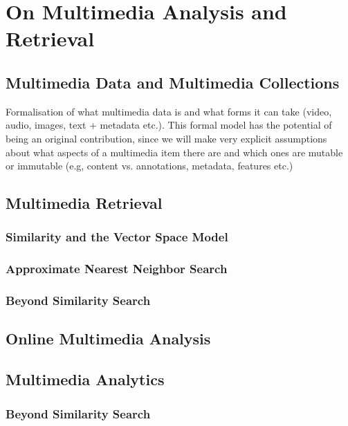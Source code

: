 \chapter{On Multimedia Analysis and Retrieval}
\label{chapter:theory_multimedia_analysis_and_retrieval}


\section{Multimedia Data and Multimedia Collections}
\label{section:multmedia_data}
Formalisation of what multimedia data is and what forms it can take (video, audio, images, text + metadata etc.). This formal model has the potential of being an original contribution, since we will make very explicit assumptions about what aspects of a multimedia item there are and which ones are mutable or immutable (e.g, content vs. annotations, metadata, features etc.)

\section{Multimedia Retrieval}

\subsection{Similarity and the Vector Space Model}
\subsection{Approximate Nearest Neighbor Search}


\subsection{Beyond Similarity Search}

\section{Online Multimedia Analysis}

\section{Multimedia Analytics}

\subsection{Beyond Similarity Search}

